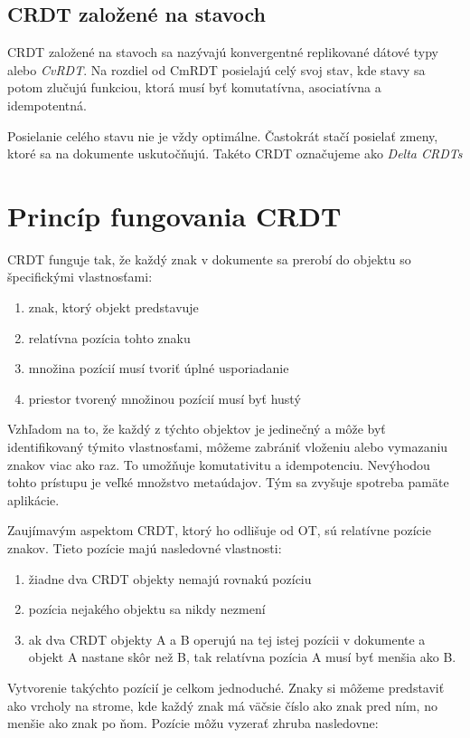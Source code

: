\subsection{CRDT založené na stavoch}
CRDT založené na stavoch sa nazývajú konvergentné replikované dátové typy alebo \textit{CvRDT}.
Na rozdiel od CmRDT posielajú celý svoj stav, kde stavy sa potom zlučujú funkciou,
ktorá musí byť komutatívna, asociatívna a idempotentná.

Posielanie celého stavu nie je vždy optimálne. Častokrát stačí posielať zmeny, ktoré sa na dokumente
uskutočňujú. Takéto CRDT označujeme ako \textit{Delta CRDTs}

\section{Princíp fungovania CRDT}
CRDT funguje tak, že každý znak v dokumente sa prerobí do objektu so špecifickými vlastnosťami:
\begin{enumerate}
  \label{def_pozicie}
  \item znak, ktorý objekt predstavuje
  \item relatívna pozícia tohto znaku
  \item množina pozícií musí tvoriť úplné usporiadanie
  \item priestor tvorený množinou pozícií musí byť hustý
\end{enumerate}
Vzhľadom na to, že každý z týchto objektov je jedinečný a môže byť identifikovaný
týmito vlastnosťami, môžeme zabrániť vloženiu alebo vymazaniu znakov viac ako raz.
To umožňuje komutativitu a idempotenciu. Nevýhodou tohto prístupu je veľké množstvo metaúdajov.
Tým sa zvyšuje spotreba pamäte aplikácie.

Zaujímavým aspektom CRDT, ktorý ho odlišuje od OT, sú relatívne pozície znakov. Tieto pozície majú
nasledovné vlastnosti:
\begin{enumerate}
  \item žiadne dva CRDT objekty nemajú rovnakú pozíciu
  \item pozícia nejakého objektu sa nikdy nezmení
  \item ak dva CRDT objekty A a B operujú na tej istej pozícii v dokumente a objekt A
  nastane skôr než B, tak relatívna pozícia A musí byť menšia ako B.
\end{enumerate}
Vytvorenie takýchto pozícií je celkom jednoduché.
Znaky si môžeme predstaviť ako vrcholy na strome, kde každý znak má väčsie číslo ako znak pred
ním, no menšie ako znak po ňom. Pozície môžu vyzerať zhruba nasledovne:

